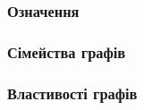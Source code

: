 
\subsubsection{Означення}


\subsubsection{Сімейства графів}


\subsubsection{Властивості графів}

